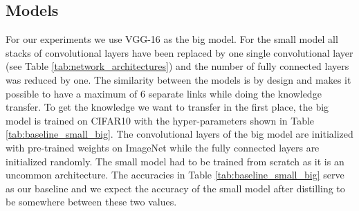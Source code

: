 \documentclass[10pt,twocolumn,letterpaper]{article}
\begin{document}
\subsection{Models}

For our experiments we use VGG-16 \cite{DBLP:journals/corr/SimonyanZ14a} as the big model. For the small model all stacks of convolutional layers have been replaced by one single convolutional layer (see Table \ref{tab:network_architectures}) and the number of fully connected layers was reduced by one. The similarity between the models is by design and makes it possible to have a maximum of 6 separate links while doing the knowledge transfer. To get the knowledge we want to transfer in the first place, the big model is trained on CIFAR10 \cite{krizhevsky2009learning} with the hyper-parameters shown in Table \ref{tab:baseline_small_big}. The convolutional layers of the big model are initialized with pre-trained weights on ImageNet \cite{ILSVRC15} while the fully connected layers are initialized randomly. The small model had to be trained from scratch as it is an uncommon architecture. The accuracies in Table \ref{tab:baseline_small_big} serve as our baseline and we expect the accuracy of the small model after distilling to be somewhere between these two values.
\end{document}
